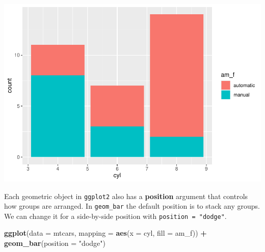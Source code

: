 \documentclass[
]{article}
\newenvironment{Shaded}{\begin{snugshade}}{\end{snugshade}}
\newcommand{\AttributeTok}[1]{\textcolor[rgb]{0.13,0.29,0.53}{#1}}
\newcommand{\CommentTok}[1]{\textcolor[rgb]{0.56,0.35,0.01}{\textit{#1}}}
\newcommand{\DecValTok}[1]{\textcolor[rgb]{0.00,0.00,0.81}{#1}}
\newcommand{\FunctionTok}[1]{\textcolor[rgb]{0.13,0.29,0.53}{\textbf{#1}}}
\newcommand{\NormalTok}[1]{#1}
\newcommand{\OtherTok}[1]{\textcolor[rgb]{0.56,0.35,0.01}{#1}}
\newcommand{\SpecialCharTok}[1]{\textcolor[rgb]{0.81,0.36,0.00}{\textbf{#1}}}
\newcommand{\StringTok}[1]{\textcolor[rgb]{0.31,0.60,0.02}{#1}}
\begin{document}
\begin{Shaded}
\end{Shaded}

\begin{center}\includegraphics{P1_exercises_files/figure-latex/groups-bar-1} \end{center}

Each geometric object in \texttt{ggplot2} also has a
\textbf{\textbf{position}} argument that controls how groups are
arranged. In \texttt{geom\_bar} the default position is to stack any
groups. We can change it for a side-by-side position with
\texttt{position\ =\ "dodge"}.

\begin{Shaded}
\begin{Highlighting}[]
\FunctionTok{ggplot}\NormalTok{(}\AttributeTok{data =}\NormalTok{ mtcars, }\AttributeTok{mapping =} \FunctionTok{aes}\NormalTok{(}\AttributeTok{x =}\NormalTok{ cyl, }\AttributeTok{fill =}\NormalTok{ am\_f)) }\SpecialCharTok{+}
  \FunctionTok{geom\_bar}\NormalTok{(}\AttributeTok{position =} \StringTok{"dodge"}\NormalTok{)}
\end{Highlighting}
\end{Shaded}
\end{document}
